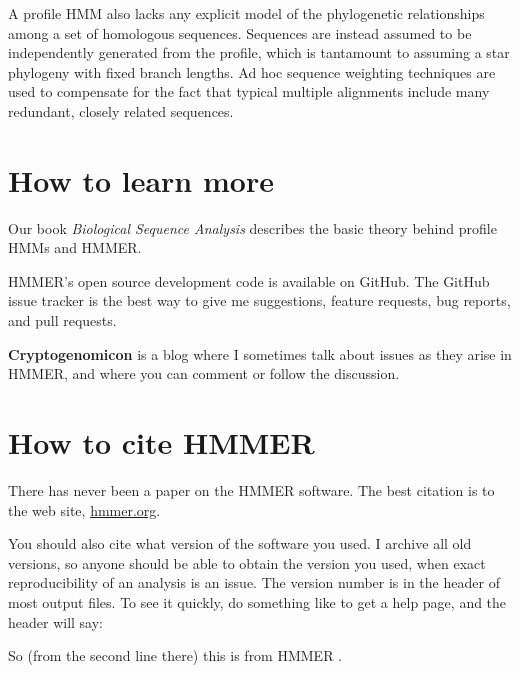A profile HMM also lacks any explicit model of the phylogenetic
relationships among a set of homologous sequences. Sequences are
instead assumed to be independently generated from the profile, which
is tantamount to assuming a star phylogeny with fixed branch
lengths. Ad hoc sequence weighting techniques are used to compensate
for the fact that typical multiple alignments include many redundant,
closely related sequences.






\section{How to learn more}

Our book \emph{Biological Sequence Analysis}\cite{Durbin98} describes the basic
theory behind profile HMMs and HMMER.

HMMER's open source development code is available on
GitHub.
The GitHub issue tracker is the best way to give me suggestions,
feature requests, bug reports, and pull requests.

\textbf{Cryptogenomicon}
  is a blog where I sometimes talk about issues as they arise in HMMER, and
where you can comment or follow the discussion.




\section{How to cite HMMER}

There has never been a paper on the HMMER software.  The best citation is to
the web site, \url{hmmer.org}.

You should also cite what version of the software you used. I archive
all old versions, so anyone should be able to obtain the version you
used, when exact reproducibility of an analysis is an issue.  The
version number is in the header of most output files. To see it
quickly, do something like  to get a help page, and
the header will say:


So (from the second line there) this is from HMMER \HMMERversion{}.

